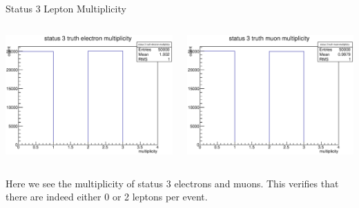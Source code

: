 \documentclass{beamer}
\begin{document}
	\begin{frame}{Status 3 Lepton Multiplicity}
		\begin{columns}
			\begin{column}{0.5\textwidth}
				\includegraphics[width = \linewidth]{truth_electron_3_multiplicity.eps}
			\end{column}
			\begin{column}{0.5\textwidth}
				\includegraphics[width = \linewidth]{truth_muon_3_multiplicity.eps}
			\end{column}
		\end{columns}
Here we see the multiplicity of status 3 electrons and muons. This verifies that there are indeed either 0 or 2 leptons per event.
	\end{frame}
\end{document}
